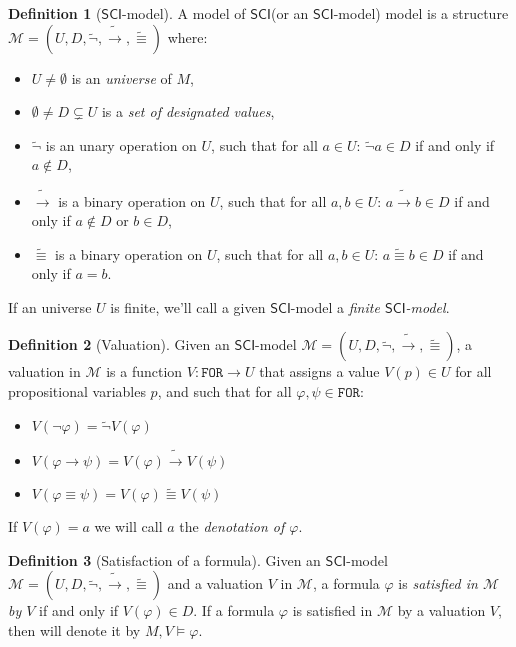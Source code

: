 \documentclass{article}
\theoremstyle{definition}
\newtheorem{definition}{Definition}[section]
\theoremstyle{definition}
\theoremstyle{definition}
\theoremstyle{definition}
\theoremstyle{definition}
\newcommand*{\id}{\equiv}
\newcommand*{\ra}{\rightarrow}
\newcommand*{\FOR}{\texttt{FOR}}
\newcommand{\SCI}{$\mathsf{SCI}$\xspace}
\begin{document}
\begin{definition}[\SCI-model]
    A model of \SCI (or an \SCI-model) model is a structure $\mathcal{M} = (U, D, \tilde{\lnot}, \tilde{\ra}, \tilde{\id})$ where:
    \begin{itemize}
        \item $U \not = \emptyset$ is an \emph{universe} of $M$,
        \item $\emptyset \not = D \subsetneq U$ is a \emph{set of designated values},
        \item $\tilde{\lnot}$ is an unary operation on $U$, such that for all $a \in U$: $\tilde{\lnot}a \in D$ if and only if $a \not \in D$,
        \item $\tilde{\ra}$ is a binary operation on $U$, such that for all $a, b \in U$: $a \tilde{\ra} b \in D$ if and only if $a \not \in D$ or $b \in D$,
        \item $\tilde{\id}$ is a binary operation on $U$, such that for all $a, b \in U$: $a \tilde{\id} b \in D$ if and only if $a = b$.
    \end{itemize}
    \label{model}
\end{definition}
%
If an universe $U$ is finite, we'll call a given \SCI-model a \emph{finite
    \SCI-model}.

\begin{definition}[Valuation]
    Given an \SCI-model $\mathcal{M} = (U, D, \tilde{\lnot}, \tilde{\ra}, \tilde{\id})$, a valuation in $\mathcal{M}$ is a function $V : \FOR \longrightarrow U$ that assigns a value $V(p) \in U$ for all propositional variables $p$, and such that for all $\varphi, \psi \in \FOR$:
    \begin{itemize}
        \item $V(\lnot \varphi) = \tilde{\lnot}V(\varphi)$
        \item $V(\varphi \ra \psi) = V(\varphi) \tilde{\ra} V(\psi)$
        \item $V(\varphi \id \psi) = V(\varphi) \tilde{\id} V(\psi)$
    \end{itemize}
    If $V(\varphi) = a$ we will call $a$ the \emph{denotation of $\varphi$}.
    \label{valuation}
\end{definition}

\begin{definition}[Satisfaction of a formula]
    Given an \SCI-model $\mathcal{M} = (U, D, \tilde{\lnot}, \tilde{\ra}, \tilde{\id})$ and a valuation $V$ in $\mathcal{M}$, a formula $\varphi$ is \emph{satisfied in $\mathcal{M}$ by $V$} if and only if $V(\varphi) \in D$. If a formula $\varphi$ is satisfied in $\mathcal{M}$ by a valuation $V$, then will denote it by $M, V \models \varphi$.
\end{definition}
\end{document}
